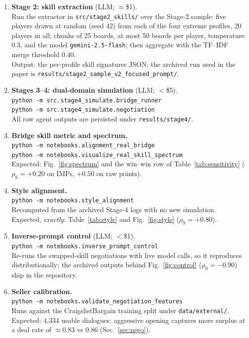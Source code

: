 \documentclass[11pt,a4paper]{article}
\newcommand{\rhoS}{\rho_{\mathrm{S}}}
\begin{document}
\begin{enumerate}
  membership-stability figures of Sec.~\ref{sec:validation}, and the
  strict-definition overlaps of Sec.~\ref{sec:validation} (Jaccard
  overlaps of 1.00, 0.14, 0.95, and 0.94, and $\rhoS=+0.80$ under the
  strict preempt definition). Passing \texttt{parity} instead of \texttt{match}
  reproduces the dealer-rotation artefact discussed in the text.
  \item \textbf{Stage 2: skill extraction} (LLM; $\approx$\$1).\\
  Run the extractor in \texttt{src/stage2\_skills/} over the Stage-2
  sample: five players drawn at random (seed 42) from each of the four
  extreme profiles, 20 players in all; chunks of 25 boards, at most 50
  boards per player, temperature 0.3, and the model
  \texttt{gemini-2.5-flash}; then aggregate with the TF--IDF merge
  threshold 0.40.\\
  Output: the per-profile skill signatures JSON; the archived run used
  in the paper is \texttt{results/stage2\_sample\_v2\_focused\_prompt/}.
  \item \textbf{Stages 3--4: dual-domain simulation} (LLM; $<$\$5).\\
  \texttt{python -m src.stage4\_simulate.bridge\_runner}\\
  \texttt{python -m src.stage4\_simulate.negotiation}\\
  All raw agent outputs are persisted under \texttt{results/stage4/}.
  \item \textbf{Bridge skill metric and spectrum.}\\
  \texttt{python -m notebooks.alignment\_real\_bridge}\\
  \texttt{python -m notebooks.visualize\_real\_skill\_spectrum}\\
  Expected: Fig.~\ref{fig:spectrum} and the win--win row of
  Table~\ref{tab:sensitivity} ($\rhoS=+0.20$ on IMPs, $+0.50$ on raw
  points).
  \item \textbf{Style alignment.}\\
  \texttt{python -m notebooks.style\_alignment}\\
  Recomputed from the archived Stage-4 logs with no new simulation.
  Expected, \emph{exactly}: Table~\ref{tab:style} and
  Fig.~\ref{fig:style} ($\rhoS=+0.80$).
  \item \textbf{Inverse-prompt control} (LLM; $<$\$1).\\
  \texttt{python -m notebooks.inverse\_prompt\_control}\\
  Re-runs the swapped-skill negotiations with live model calls, so it
  reproduces distributionally; the archived outputs behind
  Fig.~\ref{fig:control} ($\rhoS=-0.90$) ship in the repository.
  \item \textbf{Seller calibration.}\\
  \texttt{python -m notebooks.validate\_negotiation\_features}\\
  Runs against the CraigslistBargain training split under
  \texttt{data/external/}. Expected: 4{,}334 usable dialogues;
  aggressive opening captures more surplus at a deal rate of
  $\approx0.83$ vs $0.86$ (Sec.~\ref{sec:nego}).
\end{enumerate}
\end{document}
